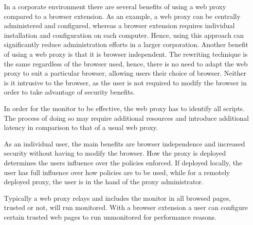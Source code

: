 \documentclass{llncs}
\begin{document}
In a corporate environment there are several benefits of using a web proxy 
compared to a browser extension. As an example, a web proxy can be centrally 
administered and configured, whereas a browser extension requires individual installation 
and configuration on each computer. Hence, using this approach can significantly 
reduce administration efforts in a larger corporation. 
Another benefit of using a web proxy is that it is browser independent. The 
rewriting technique is the same regardless of the browser used, hence, there is no 
need to adapt the web proxy to suit a particular browser, allowing 
users their choice of browser.
Neither is it intrusive to the browser, as the user is not required to modify the 
browser in order to take advantage of security benefits. 

In order for the monitor to be effective, the web proxy 
has to identify all scripts. The process of doing so may require additional 
resources and introduce additional 
latency in comparison to that of a usual web proxy.

As an individual user, the main benefits are browser independence and  
increased security without having to modify the browser. How the proxy is 
deployed determines the users influence over 
the policies enforced. If deployed locally, the user has full influence over 
how policies are to be used, while for a remotely deployed proxy, the user is 
in the hand of the proxy administrator. 

Typically a web proxy relays and includes the monitor in all browsed pages, 
trusted or not, will run monitored. With a browser extension a user can
configure certain trusted web pages to run unmonitored for performance reasons.
\end{document}
